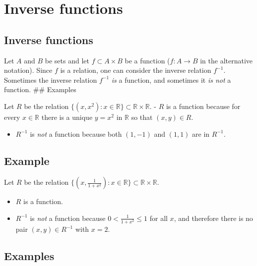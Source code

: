 \documentclass[
]{article}
\author{}
\date{}
\providecommand{\tightlist}{%
  \setlength{\itemsep}{0pt}\setlength{\parskip}{0pt}}
\begin{document}
\hypertarget{inverse-functions}{%
\section{Inverse functions}\label{inverse-functions}}

\hypertarget{inverse-functions-1}{%
\subsection{Inverse functions}\label{inverse-functions-1}}

Let \(A\) and \(B\) be sets and let \(f\subset A\times B\) be a function
(\(f:A\to B\) in the alternative notation). Since \(f\) is a relation,
one can consider the inverse relation \(f^{-1}\). \vfill Sometimes the
inverse relation \(f^{-1}\) \emph{is} a function, and sometimes it
\emph{is not} a function. \vfill\eject \#\# Examples

Let \(R\) be the relation
\(\{(x,x^2):x\in\mathbb{R}\}\subset\mathbb{R}\times\mathbb{R}\). \vfill
- \(R\) is a function because for every \(x\in\mathbb{R}\) there is a
unique \(y=x^2\) in \(\mathbb{R}\) so that \((x,y)\in R\).

\vfill

\begin{itemize}
\tightlist
\item
  \(R^{-1}\) is \emph{not} a function because both \((1,-1)\) and
  \((1,1)\) are in \(R^{-1}\).
\end{itemize}

\vfill\eject

\hypertarget{example}{%
\subsection{Example}\label{example}}

Let \(R\) be the relation
\(\{(x,\frac{1}{1+x^2}):x\in\mathbb{R}\}\subset\mathbb{R}\times\mathbb{R}\).

\begin{itemize}
\item
  \(R\) is a function. \vfill
\item
  \(R^{-1}\) is \emph{not} a function because \(0<\frac{1}{1+x^2}\le 1\)
  for all \(x\), and therefore there is no pair \((x,y)\in R^{-1}\) with
  \(x=2\).
\end{itemize}

\vfill\eject

\hypertarget{examples}{%
\subsection{Examples}\label{examples}}
\end{document}
